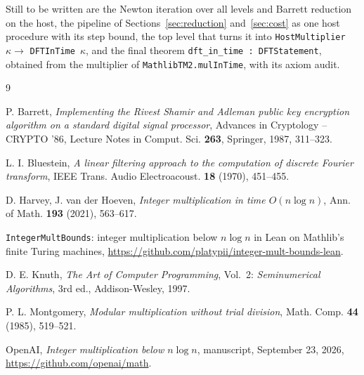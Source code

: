 \documentclass[11pt]{amsart}
\begin{document}
Still to be written are the Newton iteration over all levels and Barrett reduction on the
host, the pipeline of Sections~\ref{sec:reduction} and~\ref{sec:cost} as one host procedure
with its step bound, the top level that turns it into \texttt{HostMultiplier}~$\kappa \to$
\texttt{DFTInTime}~$\kappa$, and the final theorem \texttt{dft\_in\_time : DFTStatement},
obtained from the multiplier of \texttt{MathlibTM2.mulInTime}, with its axiom audit.

\begin{thebibliography}{9}

 P. Barrett,
\emph{Implementing the Rivest Shamir and Adleman public key encryption algorithm on a standard
digital signal processor}, Advances in Cryptology -- CRYPTO '86, Lecture Notes in Comput.
Sci. \textbf{263}, Springer, 1987, 311--323.

 L. I. Bluestein,
\emph{A linear filtering approach to the computation of discrete Fourier transform},
IEEE Trans. Audio Electroacoust. \textbf{18} (1970), 451--455.

 D. Harvey, J. van der Hoeven,
\emph{Integer multiplication in time $O(n \log n)$}, Ann. of Math. \textbf{193} (2021),
563--617.

 \texttt{IntegerMultBounds}: integer multiplication below $n \log n$ in Lean on
Mathlib's finite Turing machines,
\url{https://github.com/platypii/integer-mult-bounds-lean}.

 D. E. Knuth,
\emph{The Art of Computer Programming}, Vol.~2: \emph{Seminumerical Algorithms}, 3rd ed.,
Addison-Wesley, 1997.

 P. L. Montgomery,
\emph{Modular multiplication without trial division}, Math. Comp. \textbf{44} (1985),
519--521.

 OpenAI,
\emph{Integer multiplication below $n \log n$}, manuscript, September 23, 2026,
\url{https://github.com/openai/math}.

\end{thebibliography}
\end{document}
